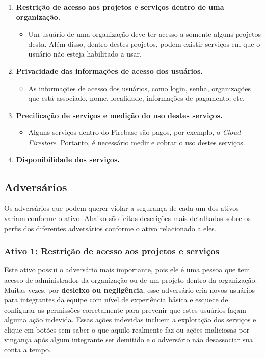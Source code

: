 \documentclass[
    openany,
    12pt,               %
    twoside,            %
    a4paper,            %
    english,            %
    brazil,             %
    ]{abntex2}
\begin{document}
\begin{enumerate}
  \item \textbf{Restrição de acesso aos projetos e serviços dentro de uma organização.}
    \begin{itemize}
    \item Um usuário de uma organização deve ter acesso a somente alguns projetos desta. Além disso, dentro destes projetos, podem existir serviços em que o usuário não esteja habilitado a usar.
    \end{itemize}
  \item \textbf{Privacidade das informações de acesso dos usuários.}
    \begin{itemize}
    \item As informações de acesso dos usuários, como login, senha, organizações que está associado, nome, localidade, informações de pagamento, etc.
    \end{itemize}
  \item \textbf{\href{https://firebase.google.com/products-build}{Precificação} de serviços e medição do uso destes serviços.}
    \begin{itemize}
    \item Alguns serviços dentro do Firebase são pagos, por exemplo, o \textit{Cloud Firestore}. Portanto, é necessário medir e cobrar o uso destes serviços.
    \end{itemize}
  \item \textbf{Disponibilidade dos serviços.}
\end{enumerate}

\subsection{Adversários}
\label{cap:adversarios}

Os adversários que podem querer violar a segurança de cada um dos ativos variam conforme o ativo. Abaixo são feitas descrições mais detalhadas sobre os perfis dos diferentes adversários conforme o ativo relacionado a eles.

\subsubsection{Ativo 1: Restrição de acesso aos projetos e serviços}
\label{cap:restricao-acesso}

Este ativo possui o adversário mais importante, pois ele é uma pessoa que tem acesso de administrador da organização ou de um projeto dentro da organização. Muitas vezes, por \textbf{desleixo ou negligência}, esse adversário cria novos usuários para integrantes da equipe com nível de experiência básica e esquece de configurar as permissões corretamente para prevenir que estes usuários façam alguma ação indevida. Essas ações indevidas incluem a exploração dos serviços e clique em botões sem saber o que aquilo realmente faz ou ações maliciosas por vingança após algum integrante ser demitido e o adversário não desassociar sua conta a tempo.
    
\end{document}
